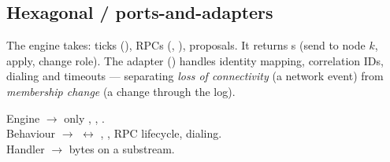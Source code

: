 \subsection{Hexagonal / ports-and-adapters}

The engine takes: ticks (), RPCs (, ), proposals. It returns s (send to node $k$, apply, change role). The adapter () handles identity mapping, correlation IDs, dialing and timeouts --- separating \emph{loss of connectivity} (a network event) from \emph{membership change} (a change through the log).

\begin{boundarybox}
Engine $\rightarrow$ only , , .\\
Behaviour $\rightarrow$  $\leftrightarrow$ , , RPC lifecycle, dialing.\\
Handler $\rightarrow$  bytes on a substream.
\end{boundarybox}
